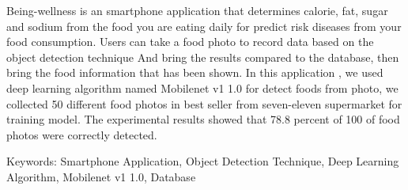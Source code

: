 \begin{englishabstract}
    Being-wellness is an smartphone application that determines calorie, fat, sugar and sodium
    from the food you are eating daily for predict risk diseases from your food consumption.
    Users can take a food photo to record data based on the object detection technique
    And bring the results compared to the database, then bring the food information that has
    been shown. In this application , we used deep learning algorithm named Mobilenet v1 1.0
    for detect foods from photo, we collected 50 different food photos in best seller from
    seven-eleven supermarket for training model. The experimental results showed that 78.8%
    percent of 100 of food photos were correctly detected.


\noindent
Keywords: Smartphone Application, Object Detection Technique, Deep Learning Algorithm,
Mobilenet v1 1.0, Database
\end{englishabstract}

